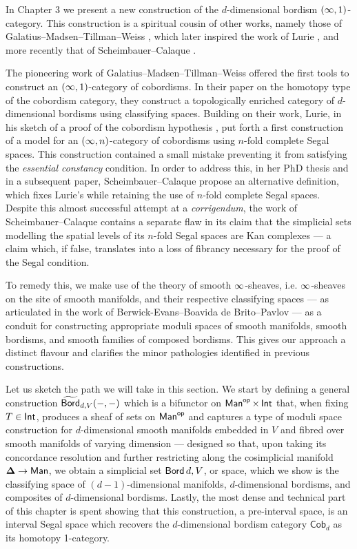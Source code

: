 In Chapter 3 we present a new construction of the $d$-dimensional bordism $(\operatorname{\infty},1)$-category. This construction is a spiritual cousin of other works, namely those of Galatius--Madsen--Tillman--Weiss \cite{GMTW09}, which later inspired the work of Lurie \cite{Lur09}, and more recently that of Scheimbauer--Calaque \cite{CS19}.

The pioneering work of Galatius--Madsen--Tillman--Weiss offered the first tools to construct an $(\operatorname{\infty},1)$-category of cobordisms. In their paper on the homotopy type of the cobordism category, they construct a topologically enriched category of $d$-dimensional bordisms using classifying spaces. Building on their work, Lurie, in his sketch of a proof of the cobordism hypothesis \cite{Lur09}, put forth a first construction of a model for an $(\operatorname{\infty},n)$-category of cobordisms using $n$-fold complete Segal spaces. This construction contained a small mistake preventing it from satisfying the \emph{essential constancy} condition. In order to address this, in her PhD thesis and in a subsequent paper, Scheimbauer--Calaque propose an alternative definition, which fixes Lurie’s while retaining the use of $n$-fold complete Segal spaces. Despite this almost successful attempt at a \emph{corrigendum}, the work of Scheimbauer--Calaque contains a separate flaw in its claim that the simplicial sets modelling the spatial levels of its $n$-fold Segal spaces are Kan complexes — a claim which, if false, translates into a loss of fibrancy necessary for the proof of the Segal condition.

To remedy this, we make use of the theory of smooth $\operatorname{\infty}$-sheaves, i.e. $\operatorname{\infty}$-sheaves on the site of smooth manifolds, and their respective classifying spaces — as articulated in the work of Berwick-Evans--Boavida de Brito--Pavlov \cite{BBEP24} — as a conduit for constructing appropriate moduli spaces of smooth manifolds, smooth bordisms, and smooth families of composed bordisms. This gives our approach a distinct flavour and clarifies the minor pathologies identified in previous constructions.

Let us sketch the path we will take in this section. We start by defining a general construction $\widetilde{\operatorname{\mathsf{Bord}}}_{d,V}(-,-)$ which is a bifunctor on $\operatorname{\sf Man}^{\mathsf{op}}\times \operatorname{\mathsf{Int}}$ that, when fixing $T\in \operatorname{\mathsf{Int}}$, produces a sheaf of sets on $\operatorname{\sf Man}^{\mathsf{op}}$ and captures a type of moduli space construction for $d$-dimensional smooth manifolds embedded in $V$ and fibred over smooth manifolds of varying dimension — designed so that, upon taking its concordance resolution and further restricting along the cosimplicial manifold $\mathbf\Delta \rightarrow \operatorname{\sf Man}$, we obtain a simplicial set $\operatorname{\mathsf{Bord}}{d,V}$, or space, which we show is the classifying space of $(d-1)$-dimensional manifolds, $d$-dimensional bordisms, and composites of $d$-dimensional bordisms. Lastly, the most dense and technical part of this chapter is spent showing that this construction, a pre-interval space, is an interval Segal space which recovers the $d$-dimensional bordism category $\mathsf{Cob}_d$ as its homotopy 1-category.

